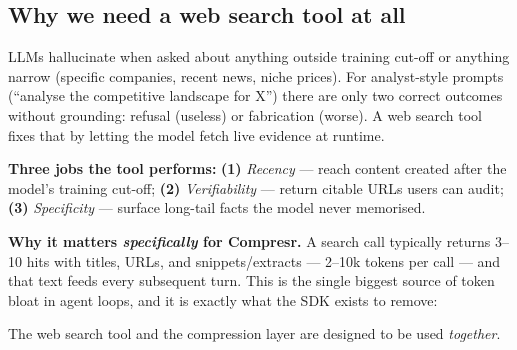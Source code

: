\documentclass[10pt,a4paper]{article}
\begin{document}
\subsection{Why we need a web search tool at all}

LLMs hallucinate when asked about anything outside training cut-off or anything narrow (specific companies, recent news, niche prices). For analyst-style prompts (``analyse the competitive landscape for X'') there are only two correct outcomes without grounding: refusal (useless) or fabrication (worse). A web search tool fixes that by letting the model fetch live evidence at runtime.

\noindent\textbf{Three jobs the tool performs:} \textbf{(1)} \emph{Recency} --- reach content created after the model's training cut-off; \textbf{(2)} \emph{Verifiability} --- return citable URLs users can audit; \textbf{(3)} \emph{Specificity} --- surface long-tail facts the model never memorised.

\noindent\textbf{Why it matters \emph{specifically} for Compresr.} A search call typically returns 3--10 hits with titles, URLs, and snippets/extracts --- 2--10k tokens per call --- and that text feeds every subsequent turn. This is the single biggest source of token bloat in agent loops, and it is exactly what the SDK exists to remove:

\begin{center}
\end{center}

\noindent The web search tool and the compression layer are designed to be used \emph{together}.
\end{document}
